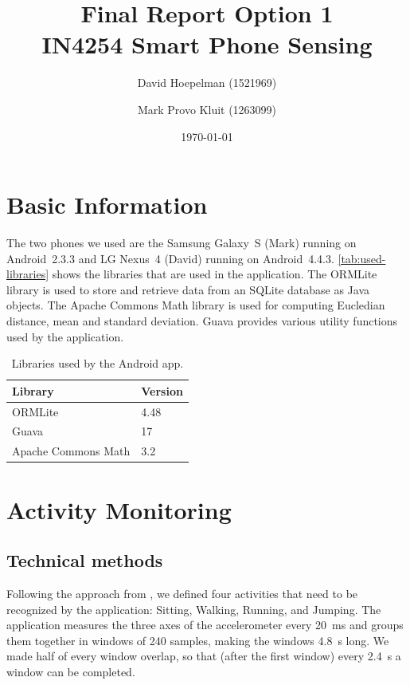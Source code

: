 \documentclass[a4paper,10pt,twoside]{IEEEtran}
\title{\huge{\textbf{Final Report Option 1}\\IN4254 Smart Phone Sensing}}
\date{\today}
\author{David Hoepelman (1521969) \and Mark Provo Kluit (1263099)}
\begin{document}
\maketitle

\newpage
{}


\newpage
{}

\section{Basic Information}
\label{sec:basic-information}
The two phones we used are the Samsung Galaxy~S (Mark) running on Android~2.3.3 and LG Nexus~4 (David) running on Android~4.4.3. \autoref{tab:used-libraries} shows the libraries that are used in the application. The ORMLite library is used to store and retrieve data from an SQLite database as Java objects. The Apache Commons Math library is used for computing Eucledian distance, mean and standard deviation. Guava provides various utility functions used by the application.

\begin{table}[ht]
\centering
\caption{Libraries used by the Android app.}
\begin{tabular}{ll}
\toprule
Library & Version\\
\midrule
ORMLite & 4.48\\
Guava & 17\\
Apache Commons Math & 3.2\\
\bottomrule
\end{tabular}
\label{tab:used-libraries}
\end{table}

\section{Activity Monitoring}
\label{sec:activity-monitoring}
\subsection{Technical methods}
Following the approach from \cite{ravi2005activity}, we defined four activities that need to be recognized by the application: Sitting, Walking, Running, and Jumping.
The application measures the three axes of the accelerometer every 20~ms and groups them together in windows of 240 samples, making the windows 4.8~s long.
We made half of every window overlap, so that (after the first window) every 2.4~s a window can be completed.
\end{document}
